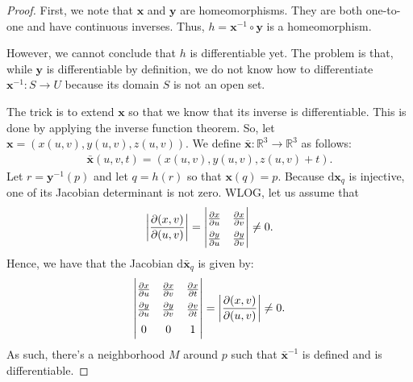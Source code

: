 \documentclass[10pt]{article}
\newcommand{\dee}{\mathrm{d}}
\newcommand{\ve}[1]{\mathbf{#1}}
\newcommand{\ra}{\rightarrow}
\newcommand{\Real}{\mathbb{R}}
\begin{document}
\begin{itemize}
    \begin{proof}
      First, we note that $\ve{x}$ and $\ve{y}$ are homeomorphisms. They are both one-to-one and have continuous inverses. Thus, $h = \ve{x}^{-1} \circ \ve{y}$ is a homeomorphism.

      However, we cannot conclude that $h$ is differentiable yet. The problem is that, while $\ve{y}$ is differentiable by definition, we do not know how to differentiate $\ve{x}^{-1}: S \ra U$ because its domain $S$ is not an open set.

      The trick is to extend $\ve{x}$ so that we know that its inverse is differentiable. This is done by applying the inverse function theorem. So, let $\ve{x} = (x(u,v), y(u,v), z(u,v))$. We define $\bar{\ve{x}}: \Real^3 \ra \Real^3$ as follows:
      \begin{align*}
        \bar{\ve{x}}(u,v,t) = (x(u,v), y(u,v), z(u,v) + t).
      \end{align*}
      Let $r = \ve{y}^{-1}(p)$ and let $q = h(r)$ so that $\ve{x}(q) = p$.
      Because $\dee \ve{x}_q$ is injective, one of its Jacobian determinant is not zero. WLOG, let us assume that
      \begin{align*}
        \renewcommand{\arraystretch}{1.5}
        \bigg| \frac{\partial(x,v)}{\partial(u,v)} \bigg|
        = \begin{vmatrix}
          \frac{\partial x}{\partial u} & \frac{\partial x}{\partial v} \\
          \frac{\partial y}{\partial u} & \frac{\partial y}{\partial v}
        \end{vmatrix}
        \neq 0.
      \end{align*}
      Hence, we have that the Jacobian $\dee \bar{\ve{x}}_q$ is given by:
      \begin{align*}
        \renewcommand{\arraystretch}{1.5}
        \begin{vmatrix}
          \frac{\partial x}{\partial u} & \frac{\partial x}{\partial v} & \frac{\partial x}{\partial t} \\
          \frac{\partial y}{\partial u} & \frac{\partial y}{\partial v} & \frac{\partial v}{\partial t} \\
          0 & 0 & 1
        \end{vmatrix}
        = \bigg| \frac{\partial(x,v)}{\partial(u,v)} \bigg| \neq 0.
      \end{align*}
      As such, there's a neighborhood $M$ around $p$ such that $\bar{\ve{x}}^{-1}$ is defined and is differentiable. 


\end{proof}
\end{itemize}
\end{document}

